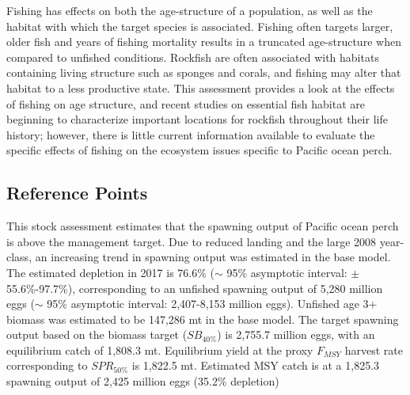 \documentclass[12pt,]{article}
\begin{document}
Fishing has effects on both the age-structure of a population, as well
as the habitat with which the target species is associated. Fishing
often targets larger, older fish and years of fishing mortality results
in a truncated age-structure when compared to unfished conditions.
Rockfish are often associated with habitats containing living structure
such as sponges and corals, and fishing may alter that habitat to a less
productive state. This assessment provides a look at the effects of
fishing on age structure, and recent studies on essential fish habitat
are beginning to characterize important locations for rockfish
throughout their life history; however, there is little current
information available to evaluate the specific effects of fishing on the
ecosystem issues specific to Pacific ocean perch.

\subsection*{Reference Points}\label{reference-points}

This stock assessment estimates that the spawning output of Pacific
ocean perch is above the management target. Due to reduced landing and
the large 2008 year-class, an increasing trend in spawning output was
estimated in the base model. The estimated depletion in 2017 is 76.6\%
(\(\sim\) 95\% asymptotic interval: \(\pm\) 55.6\%-97.7\%),
corresponding to an unfished spawning output of 5,280 million eggs
(\(\sim\) 95\% asymptotic interval: 2,407-8,153 million eggs). Unfished
age 3+ biomass was estimated to be 147,286 mt in the base model. The
target spawning output based on the biomass target (\(SB_{40\%}\)) is
2,755.7 million eggs, with an equilibrium catch of 1,808.3 mt.
Equilibrium yield at the proxy \(F_{MSY}\) harvest rate corresponding to
\(SPR_{50\%}\) is 1,822.5 mt. Estimated MSY catch is at a 1,825.3
spawning output of 2,425 million eggs (35.2\% depletion)
\end{document}
